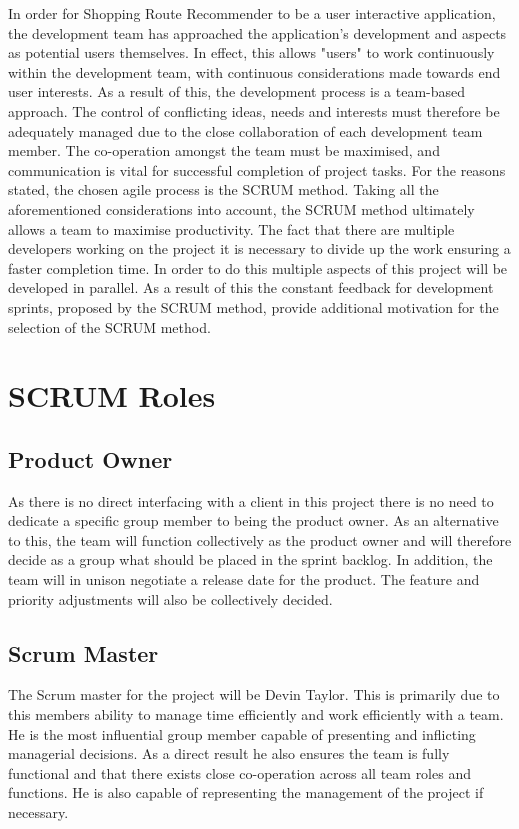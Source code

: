 \documentclass[10pt, a4paper, onecolumn]{scrartcl}
\begin{document}
			In order for Shopping Route Recommender to be a user interactive application, the development team has approached the application's development and aspects as potential users themselves. In effect, this allows "users" to work continuously within the development team, with continuous considerations made towards end user interests. As a result of this, the development process is a team-based approach. The control of conflicting ideas, needs and interests must therefore be adequately managed due to the close collaboration of each development team member. The co-operation amongst the team must be maximised, and communication is vital for successful completion of project tasks. For the reasons stated, the chosen agile process is the SCRUM method. Taking all the aforementioned considerations into account, the SCRUM method ultimately allows a team to maximise productivity.  The fact that there are multiple developers working on the project it is necessary to divide up the work ensuring a faster completion time. In order to do this multiple aspects of this project will be developed in parallel. As a result of this the constant feedback for development sprints, proposed by the SCRUM method, provide additional motivation for the selection of the SCRUM method.
		
	\section{SCRUM Roles}
	
		\subsection{Product Owner}
		
			As there is no direct interfacing with a client in this project there is no need to dedicate a specific group member to being the product owner. As an alternative to this, the team will function collectively as the product owner and will therefore decide as a group what should be placed in the sprint backlog. In addition, the team will in unison negotiate a release date for the product. The feature and priority adjustments will also be collectively decided. 
			
		\subsection{Scrum Master}
		
			The Scrum master for the project will be Devin Taylor. This is primarily due to this members ability to manage time efficiently and work efficiently with a team. He is the most influential group member capable of presenting and inflicting  managerial decisions. As a direct result he also ensures the team is fully functional and that there exists close co-operation across all team roles and functions. He is also capable of representing the management of the project if necessary.  
			
\end{document}
